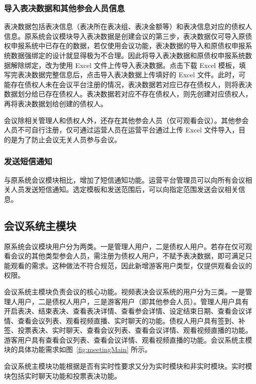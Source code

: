 \subsubsection{导入表决数据和其他参会人员信息}
表决数据包括表决信息（表决所在表决组、表决金额等）和表决信息对应的债权人信息。原系统会议模块导入表决数据是创建会议的第三步，表决数据仅可导入原债权申报系统中已存在的数据，若仅使用会议功能，表决数据的导入和原债权申报系统数据强绑定的设计就显得极为不合理。因此将导入表决数据和原债权申报系统数据解除绑定，改为使用 Excel 文件上传导入表决数据。点击下载 Excel 模板，填写完表决数据完整信息后，点击导入表决数据上传填好的 Excel 文件。此时，可能存在债权人未在会议平台注册的情况，表决数据若对应已存在债权人，则将表决数据划分给已存在债权人。表决数据若对应不存在债权人，则先创建对应债权人，再将表决数据划给创建的债权人。

会议除相关管理人和债权人外，还存在其他参会人员（仅可观看会议）。其他参会人员不可自行注册，仅可通过运营人员在运营平台通过上传 Excel 文件导入，目的是为了防止会议无关人员参与会议。

\subsubsection{发送短信通知}
与原系统会议模块相比，增加了短信通知功能。运营平台管理员可以向所有会议相关人员发送短信通知。选定模板和发送范围后，可以向指定范围发送会议相关信息。

\subsection{会议系统主模块}

原系统会议模块用户分为两类。一是管理人用户，二是债权人用户。若存在仅可观看会议的其他类型参会人员，需注册为债权人用户，不赋予表决数据，即可满足只能观看的需求。这种做法不符合规范，因此新增游客用户类型，仅提供观看会议的权限。

会议系统主模块负责会议的核心功能。视频表决会议系统的用户分为三类。一是管理人用户，二是债权人用户，三是游客用户（即其他参会人员）。管理人用户具有开启表决、结束表决、查看表决详情、查看参会详情、设定结束日期、查看会议详情、查看会议列表、观看视频直播、实时聊天的功能。债权人用户具有签到、补签、投票表决、实时聊天、查看会议列表、查看会议详情、观看视频直播的功能。游客用户具有查看会议列表、查看会议详情、观看视频直播的功能。会议系统主模块的具体功能需求如图~\ref{fig:meetingMain} 所示。

会议系统主模块功能根据是否有实时性要求又分为实时模块和非实时模块。实时模块包括实时聊天功能和投票表决功能。

